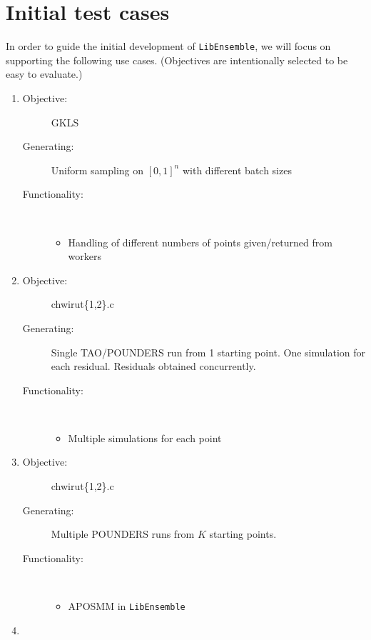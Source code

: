 \documentclass{article}
\newcommand{\libE}{\texttt{LibEnsemble}}
\begin{document}
\section{Initial test cases}
In order to guide the initial development of \libE, we will focus on supporting the following use cases. (Objectives are intentionally selected to be easy to evaluate.)
\begin{enumerate}
  \item 
    \begin{description}
      \item[Objective:] GKLS
      \item[Generating:] Uniform sampling on $[0,1]^n$ with different batch sizes
      \item[Functionality:] \
        \begin{itemize}
          \item Handling of different numbers of points given/returned from workers
        \end{itemize}
    \end{description}
    \bigskip
  \item 
    \begin{description}
      \item[Objective:] chwirut\{1,2\}.c 
      \item[Generating:] Single TAO/POUNDERS run from 1 starting point. One simulation for each residual. Residuals obtained concurrently.
      \item[Functionality:] \
        \begin{itemize}
          \item Multiple simulations for each point
        \end{itemize}
    \end{description}
    \bigskip
  \item 
    \begin{description}
      \item[Objective:] chwirut\{1,2\}.c
      \item[Generating:] Multiple POUNDERS runs from $K$ starting points.
      \item[Functionality:] \
        \begin{itemize}
          \item APOSMM in \libE
        \end{itemize}
    \end{description}
    \bigskip
  \item 
    \begin{description}

\end{description}
\end{enumerate}
\end{document}
